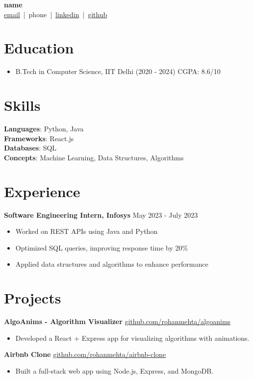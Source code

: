 \documentclass[10pt]{article}
\begin{document}
\begin{center}
    {\LARGE \textbf{ {{name}} }} \\[2pt]
    \href{mailto:{{email}}}{{email}} \,|\, {{phone}} \,|\, 
    \href{https://{{linkedin}}}{{linkedin}} \,|\, 
    \href{https://{{github}}}{{github}}
\end{center}
\vspace{4pt}

\section*{Education} \begin{itemize} \item B.Tech in Computer Science, IIT Delhi (2020 - 2024) CGPA: 8.6/10 \end{itemize}

\section*{Skills} \textbf{Languages}: Python, Java \\ \textbf{Frameworks}: React.js \\ \textbf{Databases}: SQL \\ \textbf{Concepts}: Machine Learning, Data Structures, Algorithms

\section*{Experience} \textbf{Software Engineering Intern, Infosys} \hfill May 2023 - July 2023 \begin{itemize} \item Worked on REST APIs using Java and Python \item Optimized SQL queries, improving response time by 20\% \item Applied data structures and algorithms to enhance performance \end{itemize}
\section*{Projects} \textbf{AlgoAnims - Algorithm Visualizer} \hfill \href{https://github.com/rohanmehta/algoanims}{github.com/rohanmehta/algoanims} \begin{itemize} \item Developed a React + Express app for visualizing algorithms with animations. \end{itemize} \textbf{Airbnb Clone} \hfill \href{https://github.com/rohanmehta/airbnb-clone}{github.com/rohanmehta/airbnb-clone} \begin{itemize} \item Built a full-stack web app using Node.js, Express, and MongoDB. \end{itemize}
\end{document}
